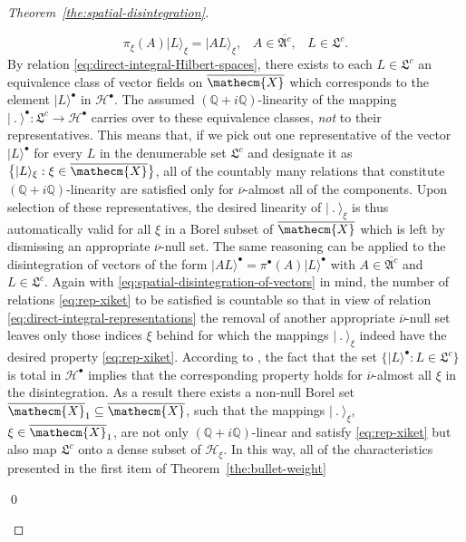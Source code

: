 \documentclass[a4paper,a4paper]{article}
\numberwithin{equation}{section}
\newcommand{\Qbb}{\mathbb{Q}}
\newcommand{\Hscr}{\mathscr{H}}
\newcommand{\Xecmbar}{\overline{\mathecm{X}}}
\newcommand{\nubar}{\overline{\nu}}
\newcommand{\Acountbar}{\overline{\mathfrak{A}^c}}
\newcommand{\idealcount}{\mathfrak{L}^c}
\newcommand{\Hbullet}{\mathscr{H}^\bullet}
\newcounter{proofitem}
\newenvironment{prooflist}{\begin{list}{(\roman{proofitem})}%
  {\usecounter{proofitem} \setlength{\topsep}{0ex}%
   \setlength{\parsep}{0.2ex} \setlength{\itemsep}{0.4ex}%
   \setlength{\leftmargin}{0em} \setlength{\itemindent}{0.5em}%
   \setlength{\listparindent}{1em}}}{\qed \end{list}}
\theoremstyle{definition}
\theoremstyle{plain}
\theoremstyle{remark}
\theoremstyle{assumption}
\newcommand{\bset}[1]{\bigl\{ #1 \bigr\}}
\newcommand{\bullket}[1]{\vert #1 \rangle^\bullet}
\newcommand{\xiket}[1]{\vert #1 \rangle_\xi}
\begin{document}
\begin{proof}[Theorem~\ref{the:spatial-disintegration}]
\begin{prooflist}
      \begin{equation}
        \label{eq:rep-xiket}
        \pi_\xi ( A ) \xiket{L} = \xiket{A L} \text{,} \quad A \in
        \Acountbar \text{,} \quad L \in \idealcount \text{.}
      \end{equation}
      By relation \eqref{eq:direct-integral-Hilbert-spaces}, there
      exists to each $L \in \idealcount$ an equivalence class of
      vector fields on $\Xecmbar$ which corresponds to the element
      $\bullket{L}$ in $\Hbullet$. The assumed $(\Qbb + i
      \Qbb)$-linearity of the mapping $\bullket{~.~} : \idealcount
      \rightarrow \Hbullet$ carries over to these equivalence classes,
      \emph{not} to their representatives. This means that, if we pick
      out one representative of the vector $\bullket{L}$ for every $L$
      in the denumerable set $\idealcount$ and designate it as
      $\bset{\xiket{L}: \xi \in \Xecmbar}$, all of the countably many
      relations that constitute $(\Qbb + i \Qbb)$-linearity are
      satisfied only for $\nubar$-almost all of the components. Upon
      selection of these representatives, the desired linearity of
      $\xiket{~.~}$ is thus automatically valid for all $\xi$ in a
      Borel subset of $\Xecmbar$ which is left by dismissing an
      appropriate $\nubar$-null set. The same reasoning can be applied
      to the disintegration of vectors of the form $\bullket{A L} =
      \pi^\bullet ( A ) \bullket{L}$ with $A \in \Acountbar$ and $L
      \in \idealcount$. Again with
      \eqref{eq:spatial-disintegration-of-vectors} in mind, the number
      of relations \eqref{eq:rep-xiket} to be satisfied is countable
      so that in view of relation
      \eqref{eq:direct-integral-representations} the removal of
      another appropriate $\nubar$-null set leaves only those indices
      $\xi$ behind for which the mappings $\xiket{~.~}$ indeed have
      the desired property \eqref{eq:rep-xiket}. According to
      \cite[Section~II.1.6, Proposition~8]{dixmier:1981}, the fact
      that the set $\bset{\bullket{L} : L \in \idealcount}$ is total
      in $\Hbullet$ implies that the corresponding property holds for
      $\nubar$-almost all $\xi$ in the disintegration. As a result
      there exists a non-null Borel set $\Xecmbar_1 \subseteq
      \Xecmbar$, such that the mappings $\xiket{~.~}$, $\xi \in
      \Xecmbar_1$, are not only $(\Qbb + i \Qbb)$-linear and satisfy
      \eqref{eq:rep-xiket} but also map $\idealcount$ onto a dense
      subset of $\Hscr_\xi$. In this way, all of the characteristics
      presented in the first item of Theorem~\ref{the:bullet-weight}

\end{prooflist}
\end{proof}
\end{document}
